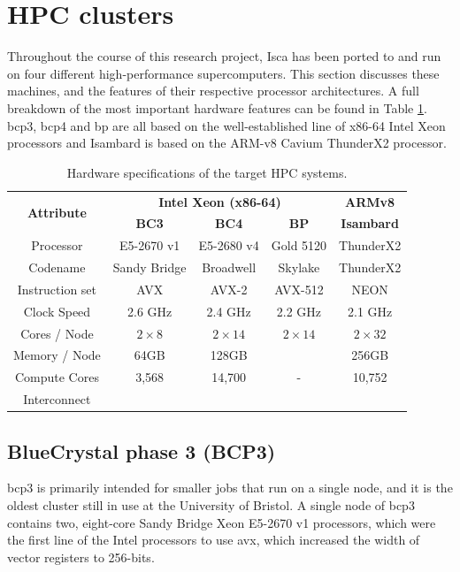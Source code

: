 \documentclass[a4paper,11pt]{report}
\begin{document}
\section{HPC clusters}
Throughout the course of this research project, Isca has been ported to and run on four different high-performance supercomputers. This section discusses these machines, and the features of their respective processor architectures. A full breakdown of the most important hardware features can be found in Table \ref{tbl:hardware}. \gls{bcp3}, \gls{bcp4} and \gls{bp} are all based on the well-established line of x86-64 Intel Xeon processors and Isambard is based on the ARM-v8 Cavium ThunderX2 processor.
\begin{table}[!ht]
\centering
\caption[Hardware specifications of the target HPC systems]{Hardware specifications of the target HPC systems. }
\begin{tabular}{@{\extracolsep{4pt}}ccccc}
\toprule 
\multirow{2}{*}{\textbf{Attribute}} & \multicolumn{3}{c}{\textbf{Intel Xeon (x86-64)}} & \multicolumn{1}{c}{\textbf{ARMv8}}\\

				\cmidrule(lr){2-4} \cmidrule(lr){5-5}

 				& {\textbf{BC3}} 	& {\textbf{BC4}} 		& {\textbf{BP}} 		& {\textbf{Isambard}} \\
\midrule
Processor	   		& E5-2670 v1 		& E5-2680 v4			& Gold 5120			& ThunderX2	\\
Codename            	& Sandy Bridge	        & Broadwell         		& Skylake       		   	& ThunderX2   	\\
Instruction set		& AVX			& AVX-2				& AVX-512			& NEON		\\
Clock Speed	   	& 2.6 GHz		    	& 2.4 GHz				& 2.2 GHz				&  2.1 GHz 	\\
Cores / Node		& $2\times8$		& $2\times14$			& $2 \times 14$			& $2\times32$	\\
Memory / Node		& 64GB			& 128GB				&					& 256GB		\\
Compute Cores		& 3,568		    	&14,700				& -					& 10,752 		\\
Interconnect		&				&					&					&			\\
\bottomrule
\end{tabular}
\label{tbl:hardware}
\end{table}

\subsection{BlueCrystal phase 3 (BCP3)}
\gls{bcp3} is primarily intended for smaller jobs that run on a single node, and it is the oldest cluster still in use at the University of Bristol. A single node of \gls{bcp3} contains two, eight-core Sandy Bridge Xeon E5-2670 v1 processors, which were the first line of the Intel processors to use \gls{avx}, which increased the width of vector registers to 256-bits. 
\end{document}
